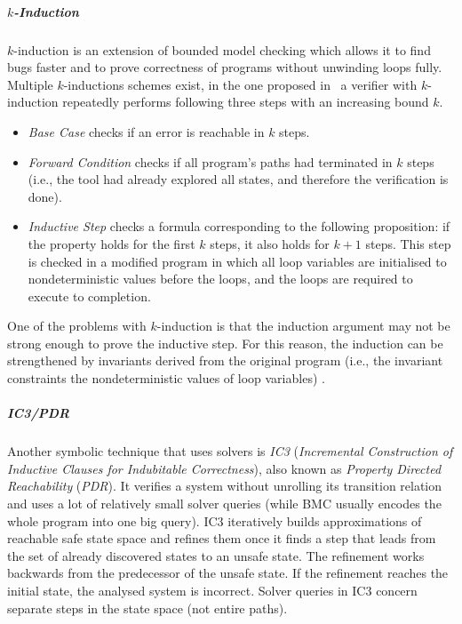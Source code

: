 \subparagraph{$k$-Induction}

$k$-induction  is an extension of
bounded model checking which allows it to find bugs faster and to prove
correctness of programs without unwinding loops fully.
Multiple $k$-inductions schemes exist, in the one proposed in~ a verifier with $k$-induction repeatedly performs following three steps with an increasing bound $k$.

\begin{itemize}
    \item \emph{Base Case} checks if an error is reachable in $k$ steps.
    \item \emph{Forward Condition} checks if all program's paths had terminated in
        $k$ steps (i.e., the tool had already explored all states, and therefore
        the verification is done).
    \item \emph{Inductive Step} checks a formula corresponding to the following
        proposition: if the property holds for the first $k$ steps, it also
        holds for $k+1$ steps.
        This step is checked in a modified program in which all loop variables
        are initialised to nondeterministic values before the loops, and the
        loops are required to execute to completion.
\end{itemize}

One of the problems with $k$-induction is that the induction argument may not be strong enough to prove the inductive step.
For this reason, the induction can be strengthened by invariants derived from the original program (i.e., the invariant constraints the nondeterministic values of loop variables) .

\subparagraph{IC3/PDR}

Another symbolic technique that uses solvers is \emph{IC3} (\emph{Incremental Construction of Inductive Clauses for Indubitable Correctness}), also known as \emph{Property Directed Reachability} (\emph{PDR}).
It verifies a system without unrolling its transition relation and uses a lot of relatively small solver queries (while BMC usually encodes the whole program into one big query).
IC3 iteratively builds approximations of reachable safe state space and refines them once it finds a step that leads from the set of already discovered states to an unsafe state.
The refinement works backwards from the predecessor of the unsafe state.
If the refinement reaches the initial state, the analysed system is incorrect.
Solver queries in IC3 concern separate steps in the state space (not entire paths).

